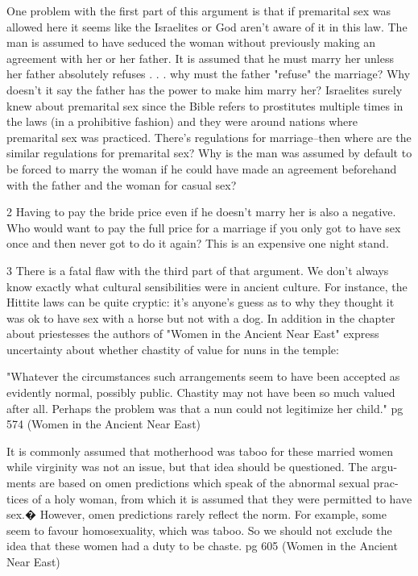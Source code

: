\documentclass[11pt]{article}
\begin{document}
{One problem with the first part of this argument is that if premarital sex was allowed here it seems like the Israelites or God aren't aware of it in this law. The man is assumed to have seduced the woman without previously making an agreement with her or her father. It is assumed that he must marry her unless her father absolutely refuses . . . why must the father "refuse" the marriage? Why doesn't it say the father has the power to make him marry her? Israelites surely knew about premarital sex since the Bible refers to prostitutes multiple times in the laws (in a prohibitive fashion) and they were around nations where premarital sex was practiced. There's regulations for marriage--then where are the similar regulations for premarital sex? Why is the man was assumed by default to be forced to marry the woman if he could have made an agreement beforehand with the father and the woman for casual sex?

2 Having to pay the bride price even if he doesn't marry her is also a negative. Who would want to pay the full price for a marriage if you only got to have sex once and then never got to do it again? This is an expensive one night stand.

3 There is a fatal flaw with the third part of that argument. We don't always know exactly what cultural sensibilities were in ancient culture. For instance, the Hittite laws can be quite cryptic: it's anyone's guess as to why they thought it was ok to have sex with a horse but not with a dog.  \cite{hittite beastiality}
In addition in the chapter about priestesses the authors of "Women in the Ancient Near East" express uncertainty about whether chastity of value for nuns in the temple:

"Whatever the circumstances such arrangements seem to have been accepted as evidently normal, possibly public. Chastity may not have been so much valued after all. Perhaps the problem was that a nun could not legitimize her child." pg 574 (Women in the Ancient Near East)



It is commonly assumed that motherhood was taboo for these married women
while virginity was not an issue, but that idea should be questioned. The argu-
ments are based on omen predictions which speak of the abnormal sexual prac-
tices of a holy woman, from which it is assumed that they were permitted to have
sex.� However, omen predictions rarely reflect the norm. For example, some
seem to favour homosexuality, which was taboo. So we should not exclude the
idea that these women had a duty to be chaste.
pg 605 (Women in the Ancient Near East)







}
\end{document}
